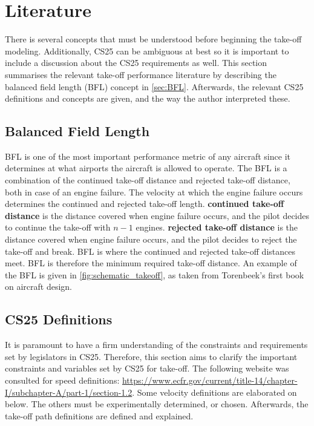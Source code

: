 \chapter{Literature}\label{chapter:literature}
There is several concepts that must be understood before beginning the take-off modeling. Additionally, CS25 can be ambiguous at best so it is important to include a discussion about the CS25 requirements as well. This section summarises the relevant take-off performance literature by describing the balanced field length (BFL) concept in \autoref{sec:BFL}. Afterwards, the relevant CS25 definitions and concepts are given, and the way the author interpreted these.

\section{Balanced Field Length}\label{sec:BFL}
BFL is one of the most important performance metric of any aircraft since it determines at what airports the aircraft is allowed to operate. The BFL is a combination of the continued take-off distance and rejected take-off distance, both in case of an engine failure. The velocity at which the engine failure occurs determines the continued and rejected take-off length.
\textbf{continued take-off distance} is the distance covered when engine failure occurs, and the pilot decides to continue the take-off with $n-1$ engines.
\textbf{rejected take-off distance} is the distance covered when engine failure occurs, and the pilot decides to reject the take-off and break.
BFL is where the continued and rejected take-off distances meet. BFL is therefore the minimum required take-off distance. An example of the BFL is given in \autoref{fig:schematic_takeoff}, as taken from Torenbeek's first book on aircraft design.

\section{CS25 Definitions}\label{sec:CS25}
It is paramount to have a firm understanding of the constraints and requirements set by legislators in CS25. Therefore, this section aims to clarify the important constraints and variables set by CS25 for take-off. The following website was consulted for speed definitions: \url{https://www.ecfr.gov/current/title-14/chapter-I/subchapter-A/part-1/section-1.2}. Some velocity definitions are elaborated on below. The others must be experimentally determined, or chosen. Afterwards, the take-off path definitions are defined and explained.

